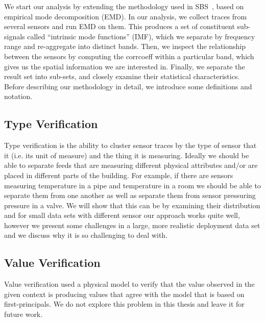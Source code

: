 We start our analysis by extending the methodology used in SBS~\cite{SBS}, based on empirical mode decomposition (EMD).  
In our analysis, we collect traces from several sensors and run EMD on them.  This produces a set of 
constituent sub-signals called ``intrinsic mode functions'' (IMF), which we separate by frequency range and re-aggregate into distinct bands.
Then, we inspect the relationship between the sensors by computing the corrcoeff within a particular band, which 
gives us the spatial information we are interested in. 
Finally, we separate the result set into sub-sets, and closely examine their statistical characteristics. 
Before describing our methodology in detail, we introduce some definitions and notation.



\subsection{Type Verification}
Type verification is the ability to cluster sensor traces by the type of sensor that it (i.e. its unit of measure) and the thing it is measuring.
Ideally we should be able to separate feeds that are measuring different physical attributes and/or are placed in different parts of the building.
For example, if there are sensors measuring temperature in a pipe and temperature in a room we should be able to separate them from one another as well
as separate them from sensor pressuring pressure in a valve.  We will show that this can be by examining their distribution and for 
small data sets with different sensor our approach works quite well, however we present some challenges in a large, more realistic deployment
data set and we discuss why it is so challenging to deal with.


\subsection{Value Verification}
Value verification used a physical model to verify that the value observed in the given context is producing values that agree with the model
that is based on first-principals.  We do not explore this problem in this thesis and leave it for future work.


